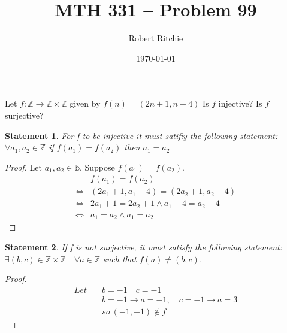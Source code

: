 \documentclass[11pt]{article}
\newtheorem{statement}{Statement}%
\begin{document}
\author{Robert Ritchie}
\title{MTH 331 -- Problem 99}
\date{\today}

\maketitle
Let $f: \mathbb{Z} \rightarrow \mathbb{Z} \times \mathbb{Z}$ given by $f(n)=(2n+1,n-4)$ Is $f$ injective? Is $f$ surjective?
\begin{statement}
For f to be injective it must satifiy the following statement: $\forall a_{1},a_{2} \in \mathbb{Z}$ if $f(a_{1})=f(a_{2})$ then $a_{1}=a_{2}$
\end{statement}

\begin{proof}
Let $a_{1},a_{2} \in \mathbb{b}$. Suppose $f(a_{1})=f(a_{2})$.
\begin{align*}
&   f(a_{1})=f(a_{2}) \\
\Leftrightarrow &(2a_{1}+1,a_{1}-4)= (2a_{2}+1,a_{2}-4) \\
\Leftrightarrow &2a_{1}+1=2a_{2}+1 \wedge a_{1}-4=a_{2}-4\\ 
\Leftrightarrow &a_{1}=a_{2} \wedge a_{1}=a_{2}\end{align*}
\end{proof}
\begin{statement}
If f is not surjective, it must satisfy the following statement: $\exists (b,c) \in \mathbb{Z} \times \mathbb{Z} \quad \forall a \in \mathbb{Z}$ such that $f(a)\neq (b,c)$.
\end{statement}
\begin{proof}
\begin{align*}
Let \quad &b=-1 \quad c=-1\\
&b=-1 \rightarrow a=-1,\quad c=-1 \rightarrow a=3\\
 &so\: (-1,-1) \not\in f
\end{align*}
\end{proof}
\end{document}
